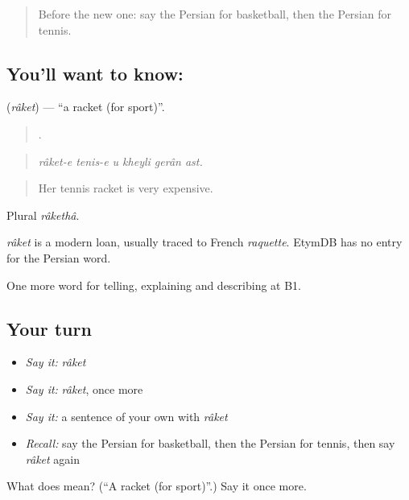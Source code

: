 \begin{quote}
Before the new one: say the Persian for basketball, then the Persian for tennis.
\end{quote}

\subsection*{You'll want to know: }
\textbf{} (\emph{râket}) — \textquotedblleft{}a racket (for sport)\textquotedblright{}.

\begin{quote}
     .
\end{quote}

\begin{quote}
\emph{râket-e tenis-e u kheyli gerân ast.}
\end{quote}

\begin{quote}
Her tennis racket is very expensive.
\end{quote}

Plural \emph{râkethâ}.

\begin{cousinweb}
\emph{râket} is a modern loan, usually traced to French \emph{raquette}. EtymDB has no entry for the Persian word.
\end{cousinweb}

\begin{grammarlens}[title={What you've built}]
One more word for telling, explaining and describing at B1.
\end{grammarlens}

\subsection*{Your turn}
\begin{itemize}
\raggedright
  \item \emph{Say it:} \emph{râket}
  \item \emph{Say it:} \emph{râket}, once more
  \item \emph{Say it:} a sentence of your own with \emph{râket}
  \item \emph{Recall:} say the Persian for basketball, then the Persian for tennis, then say \emph{râket} again
\end{itemize}

\begin{tcolorbox}[breakable,colback=teal!4,colframe=teal!35!black,title={Before you move on}]
What does  mean? (\textquotedblleft{}A racket (for sport)\textquotedblright{}.) Say it once more.
\end{tcolorbox}
